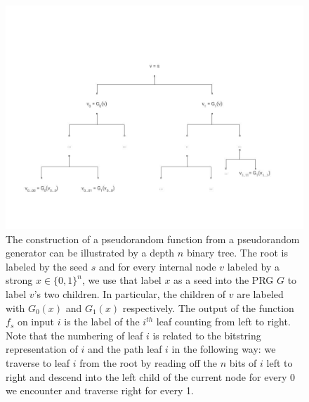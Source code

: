 \begin{figure}
\centering
\includegraphics[width=\textwidth, height=0.25\paperheight, keepaspectratio]{../figure/PRF_from_PRG.jpg}
\caption{The construction of a pseudorandom function from a pseudorandom
generator can be illustrated by a depth \(n\) binary tree. The root is
labeled by the seed \(s\) and for every internal node \(v\) labeled by a
strong \(x\in\{0,1\}^n\), we use that label \(x\) as a seed into the PRG
\(G\) to label \(v\)'s two children. In particular, the children of
\(v\) are labeled with \(G_0(x)\) and \(G_1(x)\) respectively. The
output of the function \(f_s\) on input \(i\) is the label of the
\(i^{th}\) leaf counting from left to right. Note that the numbering of
leaf \(i\) is related to the bitstring representation of \(i\) and the
path leaf \(i\) in the following way: we traverse to leaf \(i\) from the
root by reading off the \(n\) bits of \(i\) left to right and descend
into the left child of the current node for every 0 we encounter and
traverse right for every 1.}
\label{PRFfromPRGfig}
\end{figure}

